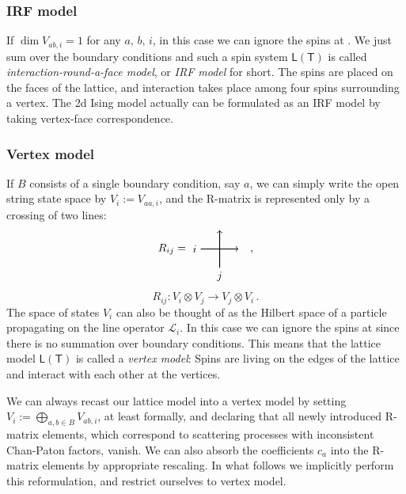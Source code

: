\subsubsection*{IRF model}

If $\dim V_{ab,i}=1$ for any $a,\,b,\,i$, in this case we can ignore
the spins at . We just sum over the boundary conditions
and such a spin system $\mathsf{L}\left(\mathsf{T}\right)$ is called
\emph{interaction-round-a-face model}, or \emph{IRF model} for short.
The spins are placed on the faces of the lattice, and interaction
takes place among four spins surrounding a vertex. The 2d Ising model
actually can be formulated as an IRF model by taking vertex-face correspondence.


\subsubsection*{Vertex model}

If $B$ consists of a single boundary condition, say $a$, we can
simply write the open string state space by $V_{i}:=V_{aa,i}$, and
the R-matrix is represented only by a crossing of two lines:
\begin{equation}
  R_{ij}
  =
    \begin{tikzpicture}[scale=0.6, baseline=(x.base)]
        \node (x) at (0,0) {\vphantom{x}};

        \draw[thick, ->] (0,0) node[left] {$i$} -- (2,0);
        \draw[thick, ->] (1,-1) node[below] {$j$} -- (1,1);

    \end{tikzpicture}
  \quad ,
\end{equation}
\begin{equation}
  R_{ij}  :  V_{i}\otimes V_{j}  \longrightarrow  V_{j}\otimes V_{i} \, .
\end{equation}
The space of states $V_{i}$ can also be thought of as the Hilbert
space of a particle propagating on the line operator $\mathcal{L}_{i}$.
In this case we can ignore the spins at  since there
is no summation over boundary conditions. This means that the lattice
model $\mathsf{L}\left(\mathsf{T}\right)$ is called a \emph{vertex
model}: Spins are living on the edges of the lattice and interact
with each other at the vertices.

We can always recast our lattice model into a vertex model by setting
$V_{i}:=\bigoplus_{a,b\in B}V_{ab,i}$, at least formally, and declaring
that all newly introduced R-matrix elements, which correspond to scattering
processes with inconsistent Chan-Paton factors, vanish. We can also
absorb the coefficients $c_{a}$ into the R-matrix elements by appropriate
rescaling. In what follows we implicitly perform this reformulation,
and restrict ourselves to vertex model.

